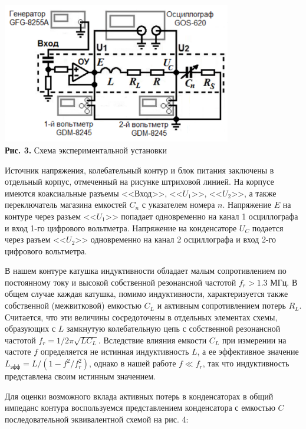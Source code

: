 \documentclass[a4paper,12pt]{article} %
\begin{document}
\begin{center}
\includegraphics[width=0.75\textwidth]{3.2.2_3.png}\\
\textbf{Рис. 3.}  Схема экспериментальной установки\\ 
\end{center}

\hfill \break Источник напряжения, колебательный контур и блок питания заключены в отдельный корпус, отмеченный на рисунке штриховой линией. На корпусе имеются коаксиальные разъемы <<Вход>>, <<$U_{1}$>>, <<$U_{2}$>>, а также переключатель магазина емкостей $C_{n}$ с указателем номера $n$. Напряжение $E$ на контуре через разъем <<$U_{1}$>> попадает одновременно на канал 1 осциллографа и вход 1-го цифрового вольтметра. Напряжение на конденсаторе $U_{C}$ подается через разъем <<$U_{2}$>> одновременно на канал 2 осциллографа и вход 2-го цифрового вольтметра.

\hfill \break В нашем контуре катушка индуктивности обладает малым сопротивлением по постоянному току и высокой собственной резонансной частотой $f_{r} > 1.3$ МГц. В общем случае каждая катушка, помимо индуктивности, характеризуется также собственной (межвитковой) емкостью $C_{L}$ и активным сопротивлением потерь $R_{L}$. Считается, что эти величины сосредоточены в отдельных элементах схемы, образующих с $L$ замкнутую колебательную цепь с собственной резонансной частотой $f_{r} = 1/2\pi \sqrt{LC_{L}}$. Вследствие влияния емкости $C_{L}$ при измерении на частоте $f$ определяется не истинная индуктивность $L$, а ее эффективное значение $L_\text{эфф} = L/(1-f^2/f_{r}^2)$, однако в нашей работе $f \ll f_{r}$, так что индуктивность представлена своим истинным значением.

\hfill \break Для оценки возможного вклада активных потерь в конденсаторах в общий импеданс контура воспользуемся представлением конденсатора с емкостью $C$ последовательной эквивалентной схемой на рис. 4:
\end{document}
